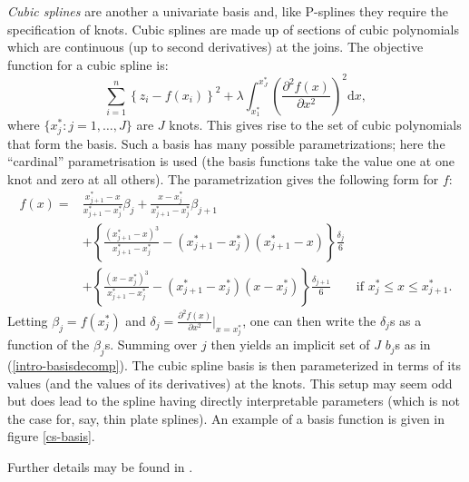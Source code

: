\textit{Cubic splines} are another a univariate basis and, like P-splines they require the specification of knots. Cubic splines are made up of sections of cubic polynomials which are continuous (up to second derivatives) at the joins. The objective function for a cubic spline is:
\begin{equation*}
\sum_{i=1}^n \left \{ z_i - f(x_i) \right \}^2 +  \lambda \int_{x^*_1}^{x^*_J}\left( \frac{\partial^2 f(x)}{\partial x^2} \right)^2 \text{d}x,
\end{equation*}
where $\{x_j^* : j=1,\ldots,J\}$ are $J$ knots. This gives rise to the set of cubic polynomials that form the basis. Such a basis has many possible parametrizations; here the ``cardinal'' parametrisation is used (the basis functions take the value one at one knot and zero at all others). The parametrization gives the following form for $f$:
\begin{align*}
f(x) =& \frac{x_{j+1}^* - x}{x_{j+1}^* - x_j^*} \beta_j + \frac{x - x_j^*}{x_{j+1}^* - x_j^*} \beta_{j+1}\\
& + \left\{ \frac{\left (x_{j+1}^* - x\right )^3}{x_{j+1}^* - x_j^*} - (x_{j+1}^* - x_j^*)(x_{j+1}^* - x)\right \}\frac{\delta_j}{6}\\
& + \left\{ \frac{\left (x - x_j^*\right )^3}{x_{j+1}^* - x_j^*} - (x_{j+1}^* - x_j^*)(x - x_j^*)\right \}\frac{\delta_{j+1}}{6} \qquad \text{if } x_j^* \leq x \leq x_{j+1}^*.
\end{align*}
Letting $\beta_j = f(x_j^*)$ and $\delta_j = \frac{\partial^2 f(x)}{\partial x^2}\vert_{x=x_j^*}$, one can then write the $\delta_j$s as a function of the $\beta_j$s. Summing over $j$ then yields an implicit set of $J$ $b_j$s as in (\ref{intro-basisdecomp}). The cubic spline basis is then parameterized in terms of its values (and the values of its derivatives) at the knots. This setup may seem odd but does lead to the spline having directly interpretable parameters (which is not the case for, say, thin plate splines). An example of a basis function is given in figure \ref{cs-basis}.

Further details may be found in .

